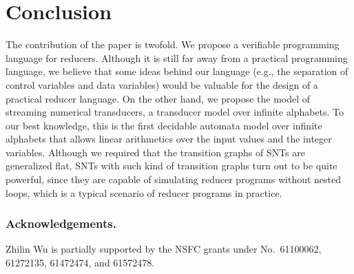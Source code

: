 	
\section{Conclusion}
\label{sec:conclusion}


The contribution of the paper is twofold. We propose a verifiable programming language for reducers. Although it is still far away from a practical programming language, we believe that some ideas behind our language (e.g., the separation of control variables and data variables) would be valuable for the design of a practical reducer language. On the other hand, we propose the model of streaming numerical transducers, a transducer model over infinite alphabets. To our best knowledge, this is the first decidable automata model over infinite alphabets that allows linear arithmetics over the input values and the integer variables. Although we required that the transition graphs of SNTs are generalized flat,  SNTs with such kind of transition graphs turn out to be quite powerful, since they are capable of simulating reducer programs without nested loops, which is a typical scenario of reducer programs in practice.


\subsubsection{Acknowledgements.} Zhilin Wu is partially supported by the NSFC grants under No.\ 61100062, 61272135, 61472474, and 61572478.


